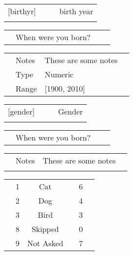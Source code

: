 \documentclass{article}
\begin{document}
\setlength{\LTleft}{0pt}
\setlength{\LTright}{\fill}
\setlength{\LTcapwidth}{\textwidth}
\vspace{.25in}





{
\begin{table}
\begin{tabularx}{\textwidth}{lXXr}
 [birthyr] &  &  & birth year \\
 & & & \\
\end{tabularx}

\begin{tabularx}{\textwidth}{lXXr}
  & When were you born? & & & \\
\end{tabularx}

\begin{tabularx}{\textwidth}{lllr}
 & Notes &  These are some notes &  \\
 & Type & Numeric & \\
 & Range & [1900, 2010] & \\
\end{tabularx}
\end{table}

\begin{table}
\begin{tabularx}{\textwidth}{lXXr}
 [gender] &  &  & Gender \\
 & & & \\
\end{tabularx}

\begin{tabularx}{\textwidth}{lXXr}
  & When were you born? & & & \\
\end{tabularx}

\begin{tabularx}{\textwidth}{lllr}
 & Notes &  These are some notes &  \\
 & & & &
\end{tabularx}

\begin{tabularx}{\textwidth}{llcXrr}
 & 1 & Cat & \dotfill & 6 & \\
 & 2 & Dog & \dotfill & 4 & \\
 & 3 & Bird & \dotfill & 3 & \\
 & 8 & Skipped & \dotfill & 0 & \\
 & 9 & Not Asked & \dotfill & 7 & \\
\end{tabularx}
\end{table}


}
\end{document}
